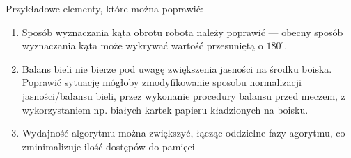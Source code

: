 \documentclass[polish,12pt]{aghthesis}
\begin{document}
Przykładowe elementy, które można poprawić:
\begin{enumerate}
\item Sposób wyznaczania kąta obrotu robota należy poprawić --- obecny
sposób wyznaczania kąta może wykrywać wartość przesuniętą o $180^\circ$.
\item Balans bieli nie bierze pod uwagę zwiększenia jasności na środku boiska.
Poprawić sytuację mógłoby zmodyfikowanie sposobu normalizacji jasności/balansu 
bieli, przez wykonanie procedury balansu przed meczem, z wykorzystaniem np.
białych kartek papieru kładzionych na boisku.
\item Wydajność algorytmu można zwiększyć, łącząc oddzielne fazy agorytmu,  
co zminimalizuje ilość dostępów do pamięci
\end{enumerate}





\end{document}
